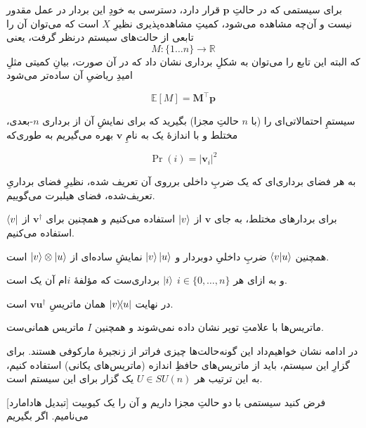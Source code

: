 
برای سیستمی که در حالتِ 
\(\mathbf{p}\)
قرار دارد، دسترسی به خودِ این بردار در عمل مقدور نیست و آن‌چه مشاهده می‌شود، کمیتِ مشاهده‌پذیری نظیرِ 
\( X \)
است که می‌توان آن را تابعی از حالت‌های سیستم درنظر گرفت، یعنی
\begin{equation} M : \{ 1 \dots n \} \to \mathbb{R} \end{equation}
که البته این تابع را می‌توان به شکلِ برداری نشان داد که در آن صورت، بیانِ کمیتی مثلِ امیدِ ریاضیِ آن ساده‌تر می‌شود

\begin{equation} \mathbb{E}[M] = \mathbf{M}^\intercal \mathbf{p} \end{equation}

سیستمِ احتمالاتی‌ای را (با \( n \) حالتِ مجزا) بگیرید که برای نمایشِ آن از برداری \( n \)-بعدی، مختلط و با اندازهٔ یک  به نامِ 
\(\mathbf{v}\)
بهره می‌گیریم به طوری‌که

\begin{equation} \Pr(i) = |\mathbf{v}_i|^2\end{equation}

به هر فضای برداری‌ای که یک ضربِ داخلی برروی آن تعریف شده، نظیرِ فضای برداریِ تعریف‌شده، فضای هیلبرت می‌گوییم.

برای بردارهای مختلط، به جای 
\(\mathbf{v}\)
از
\(\ket{v}\)
استفاده می‌کنیم و همچنین برای
\(\mathbf{v}^\dagger\)
از 
\(\bra{v}\)
استفاده می‌کنیم.

همچنین
\(\braket{v}{u}\)
ضربِ داخلیِ دوبردار و 
\(\ket{v}\ket{u}\)
نمایشِ ساده‌ای از
\(\ket{v}\otimes\ket{u}\)
است.

و به ازای هر 
\(i \in \{ 0, \dots , n \}\)
\(\ket{i}\)
برداری‌ست که مؤلفهٔ \(i\)ام آن یک است.

در نهایت
\(\dyad{v}{u}\)
همان ماتریسِ
\(\mathbf{v}\mathbf{u}^\dagger\)
است.

ماتریس‌ها با علامتِ توپر نشان داده نمی‌شوند و همچنین \(I\) ماتریس همانی‌ست.


در ادامه نشان خواهیم‌داد این گونه‌حالت‌ها چیزی فراتر از زنجیرهٔ مارکوفی هستند.
برای گزارِ این سیستم، باید از ماتریس‌های حافظِ اندازه (ماتریس‌های یکانی) استفاده کنیم، به این ترتیب هر 
\(U \in SU(n)\)
یک گزار برای این سیستم است.

[تبدیل هادامارد]
فرض کنید سیستمی با دو حالتِ مجزا داریم و آن را یک کیوبیت می‌نامیم.
اگر بگیریم

